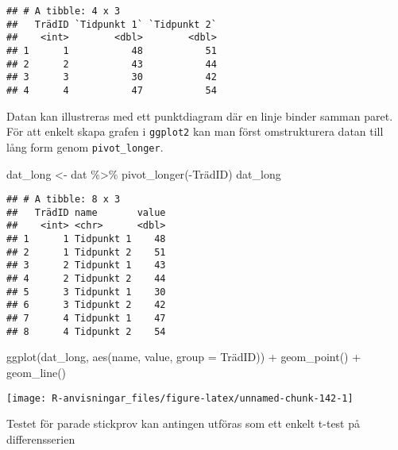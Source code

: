 \documentclass[
]{book}
\newenvironment{Shaded}{\begin{snugshade}}{\end{snugshade}}
\newcommand{\AttributeTok}[1]{\textcolor[rgb]{0.77,0.63,0.00}{#1}}
\newcommand{\FunctionTok}[1]{\textcolor[rgb]{0.00,0.00,0.00}{#1}}
\newcommand{\NormalTok}[1]{#1}
\newcommand{\OtherTok}[1]{\textcolor[rgb]{0.56,0.35,0.01}{#1}}
\newcommand{\SpecialCharTok}[1]{\textcolor[rgb]{0.00,0.00,0.00}{#1}}
\newcommand{\StringTok}[1]{\textcolor[rgb]{0.31,0.60,0.02}{#1}}
\theoremstyle{definition}
\theoremstyle{definition}
\theoremstyle{definition}
\theoremstyle{definition}
\theoremstyle{remark}
\begin{document}
\begin{verbatim}
## # A tibble: 4 x 3
##   TrädID `Tidpunkt 1` `Tidpunkt 2`
##    <int>        <dbl>        <dbl>
## 1      1           48           51
## 2      2           43           44
## 3      3           30           42
## 4      4           47           54
\end{verbatim}

Datan kan illustreras med ett punktdiagram där en linje binder samman paret. För att enkelt skapa grafen i \texttt{ggplot2} kan man först omstrukturera datan till lång form genom \texttt{pivot\_longer}.

\begin{Shaded}
\begin{Highlighting}[]
\NormalTok{dat\_long }\OtherTok{\textless{}{-}}\NormalTok{ dat }\SpecialCharTok{\%\textgreater{}\%} \FunctionTok{pivot\_longer}\NormalTok{(}\SpecialCharTok{{-}}\NormalTok{TrädID)}
\NormalTok{dat\_long}
\end{Highlighting}
\end{Shaded}

\begin{verbatim}
## # A tibble: 8 x 3
##   TrädID name       value
##    <int> <chr>      <dbl>
## 1      1 Tidpunkt 1    48
## 2      1 Tidpunkt 2    51
## 3      2 Tidpunkt 1    43
## 4      2 Tidpunkt 2    44
## 5      3 Tidpunkt 1    30
## 6      3 Tidpunkt 2    42
## 7      4 Tidpunkt 1    47
## 8      4 Tidpunkt 2    54
\end{verbatim}

\begin{Shaded}
\begin{Highlighting}[]
\FunctionTok{ggplot}\NormalTok{(dat\_long, }\FunctionTok{aes}\NormalTok{(name, value, }\AttributeTok{group =}\NormalTok{ TrädID)) }\SpecialCharTok{+}
  \FunctionTok{geom\_point}\NormalTok{() }\SpecialCharTok{+}
  \FunctionTok{geom\_line}\NormalTok{()}
\end{Highlighting}
\end{Shaded}

\begin{center}\texttt{[image: R-anvisningar\_files/figure-latex/unnamed-chunk-142-1]} \end{center}

Testet för parade stickprov kan antingen utföras som ett enkelt t-test på differensserien

\begin{Shaded}
\end{Shaded}
\end{document}
